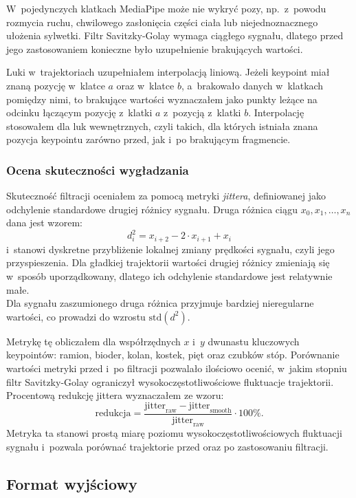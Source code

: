 W~pojedynczych klatkach MediaPipe może nie wykryć pozy, np.~z~powodu rozmycia ruchu, chwilowego zasłonięcia części ciała lub niejednoznacznego ułożenia sylwetki. Filtr Savitzky-Golay wymaga ciągłego sygnału, dlatego przed jego zastosowaniem konieczne było uzupełnienie brakujących wartości.

Luki w~trajektoriach uzupełniałem interpolacją liniową. Jeżeli keypoint miał znaną pozycję w~klatce $a$ oraz w~klatce $b$, a~brakowało danych w~klatkach pomiędzy nimi, to brakujące wartości wyznaczałem jako punkty leżące na odcinku łączącym pozycję z~klatki $a$ z~pozycją z~klatki $b$. Interpolację stosowałem dla luk wewnętrznych, czyli takich, dla których istniała znana pozycja keypointu zarówno przed, jak i~po brakującym fragmencie.

\subsubsection{Ocena skuteczności wygładzania}

Skuteczność filtracji oceniałem za pomocą metryki \textit{jittera}, definiowanej jako odchylenie standardowe drugiej różnicy sygnału. Druga różnica ciągu $x_0, x_1, \ldots, x_n$ dana jest wzorem:
\[
d^2_i = x_{i+2} - 2 \cdot x_{i+1} + x_i
\]
i~stanowi dyskretne przybliżenie lokalnej zmiany prędkości sygnału, czyli jego przyspieszenia. Dla gładkiej trajektorii wartości drugiej różnicy zmieniają się w~sposób uporządkowany, dlatego ich odchylenie standardowe jest relatywnie małe. \\ Dla sygnału zaszumionego druga różnica przyjmuje bardziej nieregularne wartości, co prowadzi do wzrostu $\mathrm{std}(d^2)$.

Metrykę tę obliczałem dla współrzędnych $x$ i~$y$ dwunastu kluczowych keypointów: ramion, bioder, kolan, kostek, pięt oraz czubków stóp. Porównanie wartości metryki przed i~po filtracji pozwalało ilościowo ocenić, w~jakim stopniu filtr Savitzky-Golay ograniczył wysokoczęstotliwościowe fluktuacje trajektorii. Procentową redukcję jittera wyznaczałem ze wzoru:
\[
\text{redukcja} =
\frac{
\text{jitter}_{\text{raw}} - \text{jitter}_{\text{smooth}}
}{
\text{jitter}_{\text{raw}}
}
\cdot 100\%.
\]
Metryka ta stanowi prostą miarę poziomu wysokoczęstotliwościowych fluktuacji sygnału i~pozwala porównać trajektorie przed oraz po zastosowaniu filtracji.


\subsection{Format wyjściowy}
\label{sec:extraction-output}

